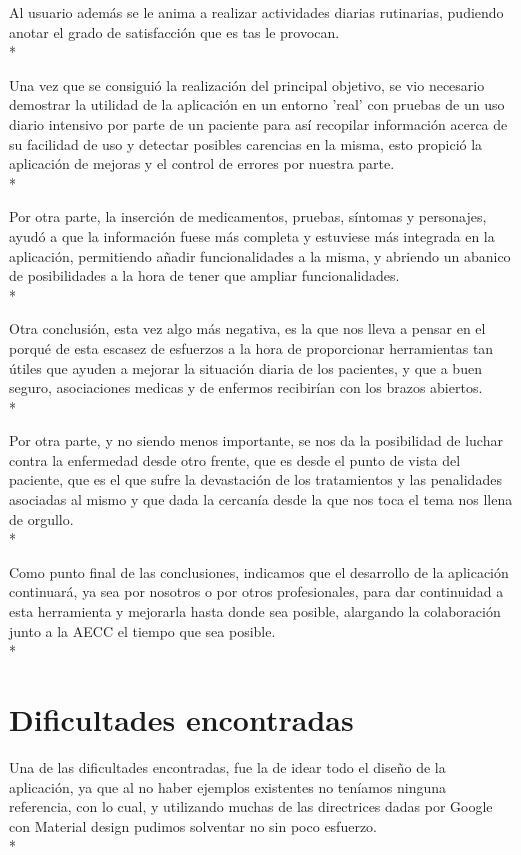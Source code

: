 \documentclass[../pfc.tex]{subfiles}
\begin{document}
	Al usuario además se le anima a realizar actividades diarias rutinarias, pudiendo anotar el grado de satisfacción que es tas le provocan.\\*
	
	Una vez que se consiguió la realización del principal objetivo, se vio necesario demostrar la utilidad de la aplicación en un entorno 'real' con pruebas de un uso diario intensivo por parte de un paciente para así recopilar información acerca de su facilidad de uso y detectar posibles carencias en la misma, esto propició la aplicación de mejoras y el control de errores por nuestra parte.\\*
	
	Por otra parte, la inserción de medicamentos, pruebas, síntomas y personajes, ayudó a que la información fuese más completa y estuviese más integrada en la aplicación, permitiendo añadir funcionalidades a la misma, y abriendo un abanico de posibilidades a la hora de tener que ampliar funcionalidades.\\*
		
	
	Otra conclusión, esta vez algo más negativa, es la que nos lleva a pensar en el porqué de esta escasez de esfuerzos a la hora de proporcionar herramientas tan útiles que ayuden a mejorar la situación diaria de los pacientes, y que a buen seguro, asociaciones medicas y de enfermos recibirían con los brazos abiertos.\\*
	 
		
	Por otra parte, y no siendo menos importante, se nos da la posibilidad de luchar contra la enfermedad desde otro frente, que es desde el punto de vista del paciente, que es el que sufre la devastación de los tratamientos y las penalidades asociadas al mismo y que dada la cercanía desde la que nos toca el tema nos llena de orgullo.\\*
	
	Como punto final de las conclusiones, indicamos que el desarrollo de la aplicación continuará, ya sea por nosotros o por otros profesionales, para dar continuidad a esta herramienta y mejorarla hasta donde sea posible, alargando la colaboración junto a la AECC el tiempo que sea posible.\\*
	
	

	\section{Dificultades encontradas}
	
	Una de las dificultades encontradas, fue la de idear todo el diseño de la aplicación, ya que al no haber ejemplos existentes no teníamos ninguna referencia, con lo cual, y utilizando muchas de las directrices dadas por Google con Material design pudimos solventar no sin poco esfuerzo.\\*
		
\end{document}
